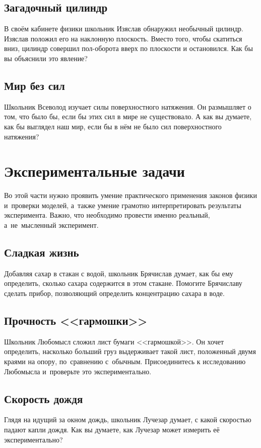 \documentclass[a4paper,12pt]{article}
\begin{document}
\subsection{Загадочный цилиндр}
В своём кабинете физики школьник Изяслав обнаружил необычный цилиндр.
Изяслав положил его на наклонную плоскость. Вместо того, чтобы скатиться вниз,
цилиндр совершил пол-оборота вверх по плоскости и остановился.
Как бы вы объяснили это явление?

\subsection{Мир без сил}
Школьник Всеволод изучает силы поверхностного натяжения. Он размышляет о том, что было бы,
если бы этих сил в мире не существовало. А как вы думаете, как бы выглядел наш мир,
если бы в нём не было сил поверхностного натяжения?

\newpage

\section{Экспериментальные задачи}

Во этой части нужно проявить умение практического применения законов физики
и~проверки моделей, а~также умение грамотно интерпретировать результаты
эксперимента. Важно, что необходимо провести именно реальный,
а~не~мысленный эксперимент.

\subsection{Сладкая жизнь}
Добавляя сахар в стакан с водой, школьник Брячислав думает, как бы ему определить,
сколько сахара содержится в этом стакане. Помогите Брячиславу сделать прибор, позволяющий
определить концентрацию сахара в воде.

\subsection{Прочность <<гармошки>>}
Школьник Любомысл сложил лист бумаги <<гармошкой>>. Он хочет определить, насколько б\emph{о}льший
груз выдерживает такой лист, положенный двумя краями на опору, по~сравнению с~обычным.
Присоединитесь к исследованию Любомысла и~проверьте это экспериментально.

\subsection{Скорость дождя}
Глядя на идущий за окном дождь, школьник Лучезар думает, с какой скоростью падают капли дождя.
Как вы думаете, как Лучезар может измерить её экспериментально?
\end{document}
